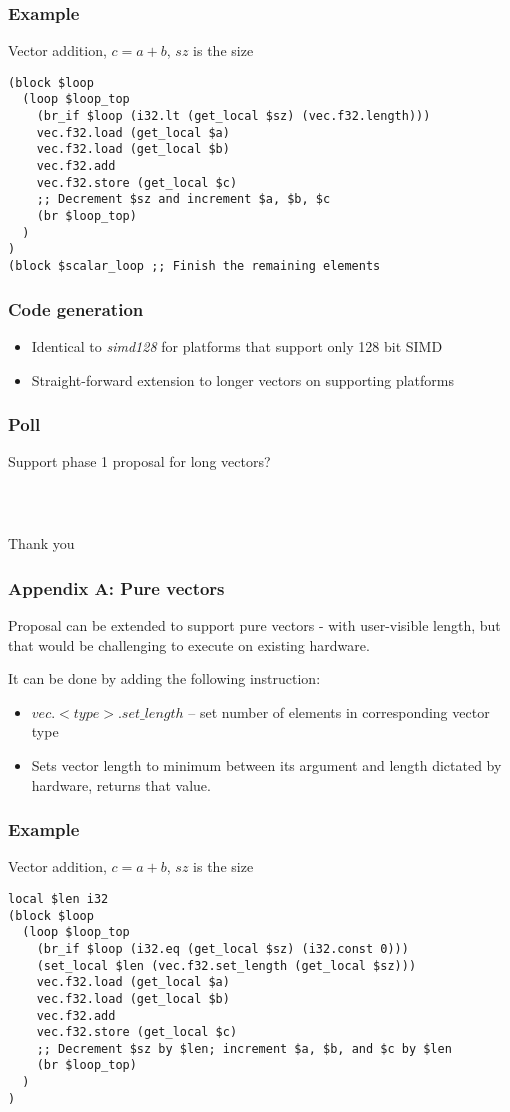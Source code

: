 \documentclass[t,aspectratio=169, xcolor={table}]{beamer}
\begin{document}
\begin{frame}[containsverbatim]
\frametitle{Example}
Vector addition, $c = a + b$, $sz$ is the size
\begin{lstlisting}
(block $loop
  (loop $loop_top
    (br_if $loop (i32.lt (get_local $sz) (vec.f32.length)))
    vec.f32.load (get_local $a)
    vec.f32.load (get_local $b)
    vec.f32.add
    vec.f32.store (get_local $c)
    ;; Decrement $sz and increment $a, $b, $c
    (br $loop_top)
  )
)
(block $scalar_loop ;; Finish the remaining elements
\end{lstlisting}
\end{frame}
\begin{frame}
\frametitle{Code generation}
  \begin{itemize}
  \item Identical to \textit{simd128} for platforms that support only 128 bit SIMD
  \item Straight-forward extension to longer vectors on supporting platforms
  \end{itemize}
\end{frame}
\begin{frame}
\frametitle{Poll}
Support phase 1 proposal for long vectors?
\end{frame}
\begin{frame}
\frametitle{~}
\huge{Thank you}
\end{frame}
\begin{frame}
\frametitle{Appendix A: Pure vectors}
  Proposal can be extended to support pure vectors - with user-visible length, but that would be challenging to execute on existing hardware.

  It can be done by adding the following instruction:

  \begin{itemize}
  \item $vec.<type>.set\_length$ -- set number of elements in corresponding vector type
  \item[] Sets vector length to minimum between its argument and length dictated by hardware, returns that value.
  \end{itemize}
\end{frame}
\begin{frame}[containsverbatim]
\frametitle{Example}
Vector addition, $c = a + b$, $sz$ is the size
\begin{lstlisting}
local $len i32
(block $loop
  (loop $loop_top
    (br_if $loop (i32.eq (get_local $sz) (i32.const 0)))
    (set_local $len (vec.f32.set_length (get_local $sz)))
    vec.f32.load (get_local $a)
    vec.f32.load (get_local $b)
    vec.f32.add
    vec.f32.store (get_local $c)
    ;; Decrement $sz by $len; increment $a, $b, and $c by $len
    (br $loop_top)
  )
)
\end{lstlisting}
\end{frame}
\end{document}
